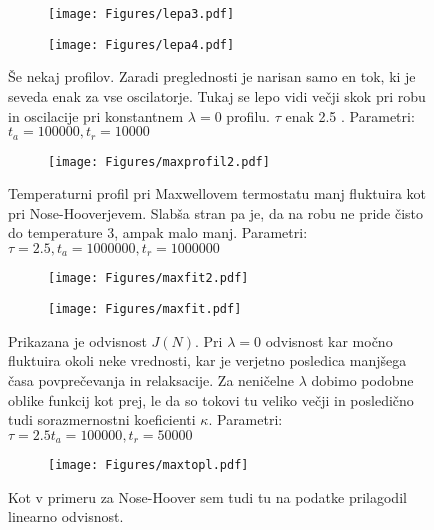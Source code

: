 \documentclass{article}
\begin{document}
\begin{figure}[H]
\centering
\begin{subfigure}{.49\textwidth}
\texttt{[image: Figures/lepa3.pdf]}
\end{subfigure}
\begin{subfigure}{.49\textwidth}
\texttt{[image: Figures/lepa4.pdf]}
\end{subfigure}
\caption*{Še nekaj profilov. Zaradi preglednosti je narisan samo en tok, ki je seveda enak za vse oscilatorje. Tukaj se lepo vidi večji skok pri robu in oscilacije pri konstantnem $\lambda=0$ profilu. $\tau$ enak 2.5 . Parametri: $ t_a=100000, t_r=10000$}
\end{figure}

\begin{figure}[H]
\centering
\begin{subfigure}{.7\textwidth}
\texttt{[image: Figures/maxprofil2.pdf]}
\end{subfigure}
\caption*{Temperaturni profil pri Maxwellovem termostatu manj fluktuira kot pri Nose-Hooverjevem. Slabša stran pa je, da na robu ne pride čisto do temperature 3, ampak malo manj. Parametri: $ \tau=2.5, t_a=1000000, t_r=1000000$}
\end{figure}

\begin{figure}[H]
\centering
\begin{subfigure}{.49\textwidth}
\texttt{[image: Figures/maxfit2.pdf]}
\end{subfigure}
\begin{subfigure}{.49\textwidth}
\texttt{[image: Figures/maxfit.pdf]}
\end{subfigure}
\caption*{Prikazana je odvisnost $J(N)$. Pri $\lambda=0$ odvisnost kar močno fluktuira okoli neke vrednosti, kar je verjetno posledica manjšega časa povprečevanja in relaksacije. Za neničelne $\lambda$ dobimo podobne oblike funkcij kot prej, le da so tokovi tu veliko večji in posledično tudi sorazmernostni koeficienti $\kappa$. Parametri: $\tau=2.5 t_a=100000, t_r=50000$}
\end{figure}

\begin{figure}[H]
\centering
\begin{subfigure}{.7\textwidth}
\texttt{[image: Figures/maxtopl.pdf]}
\end{subfigure}
\caption*{Kot v primeru za Nose-Hoover sem tudi tu na podatke prilagodil linearno odvisnost.}
\end{figure}
\end{document}
